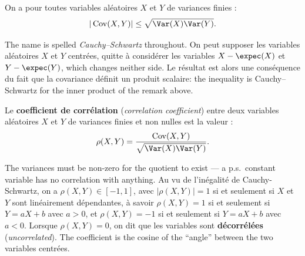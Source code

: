 \begin{prop}
  On a pour toutes variables aléatoires $X$ et $Y$ de variances finies :
  \[ |\Cov(X,Y)| \le \sqrt{\Var(X)\Var(Y)}. \]
\end{prop}

The name is spelled \emph{Cauchy--Schwartz} throughout. On peut supposer les
variables aléatoires $X$ et $Y$ centrées, quitte à considérer les variables
$X - \expec(X)$ et $Y - \expec(Y)$, which changes neither side. Le résultat est
alors une conséquence du fait que la covariance définit un produit scalaire: the
inequality is Cauchy--Schwartz for the inner product of the remark above.

\begin{definition}
  Le \textbf{coefficient de corrélation} (\textit{correlation coefficient}) entre
  deux variables aléatoires $X$ et $Y$ de variances finies et non nulles est la
  valeur :
  \[ \rho(X,Y) = \frac{\Cov(X,Y)}{\sqrt{\Var(X)\Var(Y)}}. \]
\end{definition}

The variances must be non-zero for the quotient to exist --- a p.s.\ constant
variable has no correlation with anything. Au vu de l'inégalité de
Cauchy-Schwartz, on a $\rho(X,Y) \in [-1,1]$, avec $|\rho(X,Y)| = 1$ si et
seulement si $X$ et $Y$ sont linéairement dépendantes, à savoir
$\rho(X,Y) = 1$ si et seulement si $Y = aX+b$ avec $a > 0$, et
$\rho(X,Y) = -1$ si et seulement si $Y = aX+b$ avec $a < 0$. Lorsque
$\rho(X,Y) = 0$, on dit que les variables sont \textbf{décorrélées}
(\textit{uncorrelated}). The coefficient is
the cosine of the ``angle'' between the two variables centrées.

